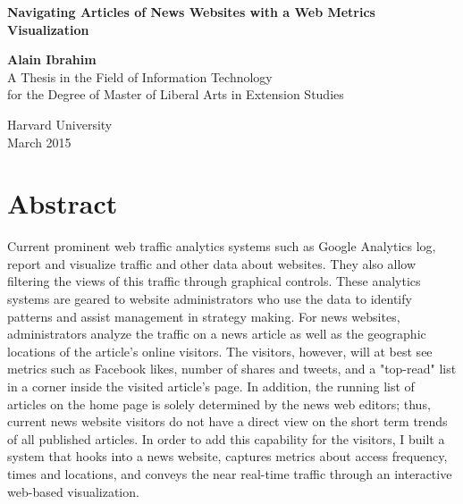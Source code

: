 \documentclass[12pt]{article}
\begin{document}

\begin{titlepage}
    \begin{center}
        
        \begin{doublespace}        
        \textbf{\Large Navigating Articles of News Websites with a Web Metrics Visualization}
        \vfill

        \vspace{2in}
        \textbf{\Large Alain Ibrahim} \\
		\vspace{2in}
        A Thesis in the Field of Information Technology \\
        for the Degree of Master of Liberal Arts in Extension Studies \\

        \vspace{.5in} 

        
        Harvard University \\
        \vspace {.4in}
        March 2015        

		\end{doublespace}        
        
        \vfill
         
    \end{center}
\end{titlepage}


\section{Abstract}

Current prominent web traffic analytics systems such as Google Analytics log, report and visualize traffic and other data about websites. They also allow filtering the views of this traffic through graphical controls. These analytics systems are geared to website administrators who use the data to identify patterns and assist management in strategy making. For news websites, administrators analyze the traffic on a news article as well as the geographic locations of the article's online visitors. The visitors, however, will at best see metrics such as Facebook likes, number of shares and tweets, and a "top-read" list in a corner inside the visited article's page. In addition, the running list of articles on the home page is solely determined by the news web editors; thus, current news website visitors do not have a direct view on the short term trends of all published articles. In order to add this capability for the visitors, I built a system that hooks into a news website, captures metrics about access frequency, times and locations, and conveys the near real-time traffic through an interactive web-based visualization.
\newpage
\end{document}
